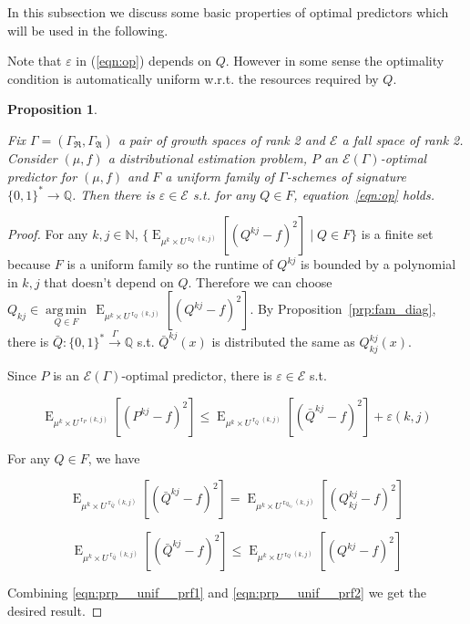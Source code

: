 \documentclass{article}
\numberwithin{equation}{section}
\theoremstyle{definition}
\theoremstyle{plain}
\newtheorem{proposition}{Proposition}[section]
\newcommand{\Words}{{\{ 0, 1 \}^*}}
\DeclareMathOperator{\E}{E}
\DeclareMathOperator{\R}{r}
\newcommand{\Argmin}[1]{\underset{#1}{\operatorname{arg\,min}}\,}
\newcommand{\Nats}{\mathbb{N}}
\newcommand{\Rats}{\mathbb{Q}}
\begin{document}
In this subsection we discuss some basic properties of optimal predictors which will be used in the following.

Note that $\varepsilon$ in (\ref{eqn:op}) depends on $Q$. However in some sense the optimality condition is automatically uniform w.r.t. the resources required by $Q$.

\begin{proposition}
\label{prp:unif}

Fix $\Gamma=(\Gamma_{\mathfrak{R}},\Gamma_{\mathfrak{A}})$ a pair of growth spaces of rank 2 and $\mathcal{E}$ a fall space of rank 2. Consider $(\mu,f)$ a distributional estimation problem, $P$ an $\mathcal{E}(\Gamma)$-optimal predictor for $(\mu,f)$ and $F$ a uniform family of $\Gamma$-schemes of signature $\Words \rightarrow \Rats$. Then there is $\varepsilon \in \mathcal{E}$ s.t. for any $Q \in F$, equation~\ref{eqn:op} holds.

\end{proposition}

\begin{proof}

For any $k,j \in \Nats$, $\{\E_{\mu^k \times U^{\R_Q(k,j)}}[(Q^{kj} - f)^2] \mid Q \in F\}$ is a finite set because $F$ is a uniform family so the runtime of $Q^{kj}$ is bounded by a polynomial in $k,j$ that doesn't depend on $Q$. Therefore we can choose ${Q_{kj} \in \Argmin{Q \in F} \E_{\mu^k \times U^{\R_Q(k,j)}}[(Q^{kj} - f)^2]}$. By Proposition~\ref{prp:fam_diag}, there is $\bar{Q}: \Words \xrightarrow{\Gamma} \Rats$ s.t. $\bar{Q}^{kj}(x)$ is distributed the same as $Q_{kj}^{kj}(x)$.

Since $P$ is an $\mathcal{E}(\Gamma)$-optimal predictor, there is $\varepsilon \in \mathcal{E}$ s.t.

\begin{equation}
\label{eqn:prp__unif__prf1}
\E_{\mu^k \times U^{\R_P(k,j)}}[(P^{kj} - f)^2] \leq \E_{\mu^k \times U^{\R_{\bar{Q}}(k,j)}}[(\bar{Q}^{kj} - f)^2] + \varepsilon(k,j)
\end{equation}

For any $Q \in F$, we have 

$$\E_{\mu^k \times U^{\R_{\bar{Q}}(k,j)}}[(\bar{Q}^{kj} - f)^2]=\E_{\mu^k \times U^{\R_{Q_{kj}}(k,j)}}[(Q_{kj}^{kj} - f)^2]$$

\begin{equation}
\label{eqn:prp__unif__prf2}
\E_{\mu^k \times U^{\R_{\bar{Q}}(k,j)}}[(\bar{Q}^{kj} - f)^2] \leq \E_{\mu^k \times U^{\R_Q(k,j)}}[(Q^{kj} - f)^2]
\end{equation}

Combining \ref{eqn:prp__unif__prf1} and \ref{eqn:prp__unif__prf2} we get the desired result.

\end{proof}
\end{document}
